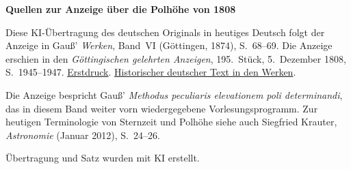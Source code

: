 \clearpage\thispagestyle{empty}
\begin{center}\textbf{Quellen zur Anzeige über die Polhöhe von 1808}\end{center}
\noindent Diese KI-Übertragung des deutschen Originals in heutiges Deutsch folgt der Anzeige in Gauß’ \textit{Werken}, Band~VI (Göttingen, 1874), S.~68--69. Die Anzeige erschien in den \textit{Göttingischen gelehrten Anzeigen}, 195.~Stück, 5.~Dezember 1808, S.~1945--1947. \href{https://manifests.sub.uni-goettingen.de/iiif/image/gdz:PPN319721507_1808:00001951/full/1200,/0/default.jpg}{Erstdruck}. \href{https://gdz.sub.uni-goettingen.de/id/PPN236007467}{Historischer deutscher Text in den Werken}.
\par\smallskip\noindent Die Anzeige bespricht Gauß’ \textit{Methodus peculiaris elevationem poli determinandi}, das in diesem Band weiter vorn wiedergegebene Vorlesungsprogramm. Zur heutigen Terminologie von Sternzeit und Polhöhe siehe auch Siegfried Krauter, \textit{Astronomie} (Januar 2012), S.~24--26.
\par\smallskip\noindent Übertragung und Satz wurden mit KI erstellt.
\clearpage
